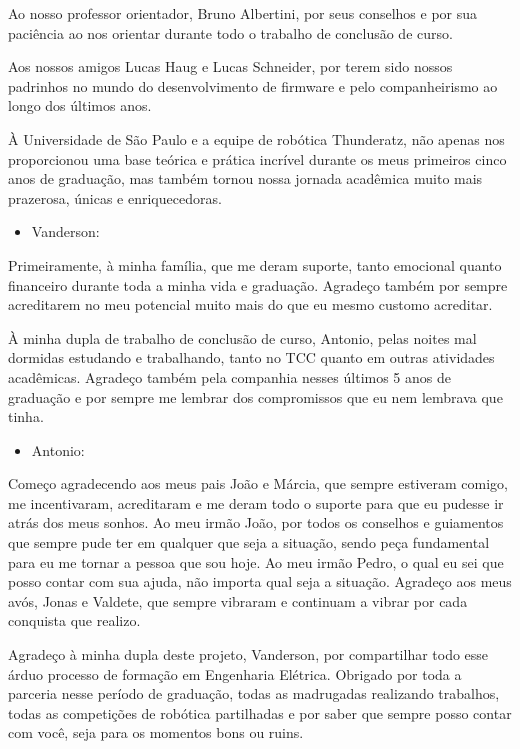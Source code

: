 \documentclass[../../monografia.tex]{subfiles}
\begin{document}
    
    {\centering    
    }

Ao nosso professor orientador, Bruno Albertini, por seus conselhos e por sua paciência ao nos orientar durante todo o trabalho de conclusão de curso.

Aos nossos amigos Lucas Haug e Lucas Schneider, por terem sido nossos padrinhos no mundo do desenvolvimento de firmware e pelo companheirismo ao longo dos últimos anos.

À Universidade de São Paulo e a equipe de robótica Thunderatz, não apenas nos proporcionou uma base teórica e prática incrível durante os meus primeiros cinco anos de graduação, mas também tornou nossa jornada acadêmica muito mais prazerosa, únicas e enriquecedoras.

\vspace{6mm}

\begin{itemize}
    \item Vanderson:
\end{itemize}

Primeiramente, à minha família, que me deram suporte, tanto emocional quanto financeiro durante toda a minha vida e graduação. Agradeço também por sempre acreditarem no meu potencial muito mais do que eu mesmo customo acreditar. 

À minha dupla de trabalho de conclusão de curso, Antonio, pelas noites mal dormidas estudando e trabalhando, tanto no TCC quanto em outras atividades acadêmicas. Agradeço também pela companhia nesses últimos 5 anos de graduação e por sempre me lembrar dos compromissos que eu nem lembrava que tinha.


\vspace{6mm}

\begin{itemize}
    \item Antonio:
\end{itemize}

Começo agradecendo aos meus pais João e Márcia, que sempre estiveram comigo, me incentivaram, acreditaram e me deram todo o suporte para que eu pudesse ir atrás dos meus sonhos. Ao meu irmão João, por todos os conselhos e guiamentos que sempre pude ter em qualquer que seja a situação, sendo peça fundamental para eu me tornar a pessoa que sou hoje. Ao meu irmão Pedro, o qual eu sei que posso contar com sua ajuda, não importa qual seja a situação. Agradeço aos meus avós, Jonas e Valdete, que sempre vibraram e continuam a vibrar por cada conquista que realizo.

Agradeço à minha dupla deste projeto, Vanderson, por compartilhar todo esse árduo processo de formação em Engenharia Elétrica. Obrigado por toda a parceria nesse período de graduação, todas as madrugadas realizando trabalhos, todas as competições de robótica partilhadas e por saber que sempre posso contar com você, seja para os momentos bons ou ruins.
\end{document}
